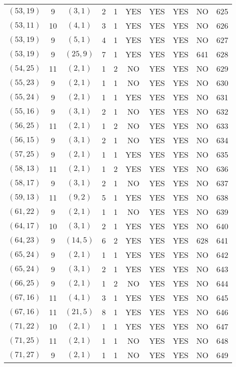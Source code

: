 \begin{longtable}{|c|c|c|c|c|c|c|c|c|c|}
$(53, 19)$ & 9 & $(3, 1)$ & 2 & 1 & YES & YES & YES & NO & 625\\
$(53, 11)$ & 10 & $(4, 1)$ & 3 & 1 & YES & YES & YES & NO & 626\\
$(53, 19)$ & 9 & $(5, 1)$ & 4 & 1 & YES & YES & YES & NO & 627\\
$(53, 19)$ & 9 & $(25, 9)$ & 7 & 1 & YES & YES & YES & 641 & 628\\
$(54, 25)$ & 11 & $(2, 1)$ & 1 & 2 & NO & YES & YES & NO & 629\\
$(55, 23)$ & 9 & $(2, 1)$ & 1 & 1 & NO & YES & YES & NO & 630\\
$(55, 24)$ & 9 & $(2, 1)$ & 1 & 1 & YES & YES & YES & NO & 631\\
$(55, 16)$ & 9 & $(3, 1)$ & 2 & 1 & NO & YES & YES & NO & 632\\
$(56, 25)$ & 11 & $(2, 1)$ & 1 & 2 & NO & YES & YES & NO & 633\\
$(56, 15)$ & 9 & $(3, 1)$ & 2 & 1 & NO & YES & YES & NO & 634\\
$(57, 25)$ & 9 & $(2, 1)$ & 1 & 1 & YES & YES & YES & NO & 635\\
$(58, 13)$ & 11 & $(2, 1)$ & 1 & 2 & YES & YES & YES & NO & 636\\
$(58, 17)$ & 9 & $(3, 1)$ & 2 & 1 & NO & YES & YES & NO & 637\\
$(59, 13)$ & 11 & $(9, 2)$ & 5 & 1 & YES & YES & YES & NO & 638\\
$(61, 22)$ & 9 & $(2, 1)$ & 1 & 1 & NO & YES & YES & NO & 639\\
$(64, 17)$ & 10 & $(3, 1)$ & 2 & 1 & YES & YES & YES & NO & 640\\
$(64, 23)$ & 9 & $(14, 5)$ & 6 & 2 & YES & YES & YES & 628 & 641\\
$(65, 24)$ & 9 & $(2, 1)$ & 1 & 1 & YES & YES & YES & NO & 642\\
$(65, 24)$ & 9 & $(3, 1)$ & 2 & 1 & YES & YES & YES & NO & 643\\
$(66, 25)$ & 9 & $(2, 1)$ & 1 & 2 & NO & YES & YES & NO & 644\\
$(67, 16)$ & 11 & $(4, 1)$ & 3 & 1 & YES & YES & YES & NO & 645\\
$(67, 16)$ & 11 & $(21, 5)$ & 8 & 1 & YES & YES & YES & NO & 646\\
$(71, 22)$ & 10 & $(2, 1)$ & 1 & 1 & YES & YES & YES & NO & 647\\
$(71, 25)$ & 11 & $(2, 1)$ & 1 & 1 & NO & YES & YES & NO & 648\\
$(71, 27)$ & 9 & $(2, 1)$ & 1 & 1 & NO & YES & YES & NO & 649\\

\end{longtable}

